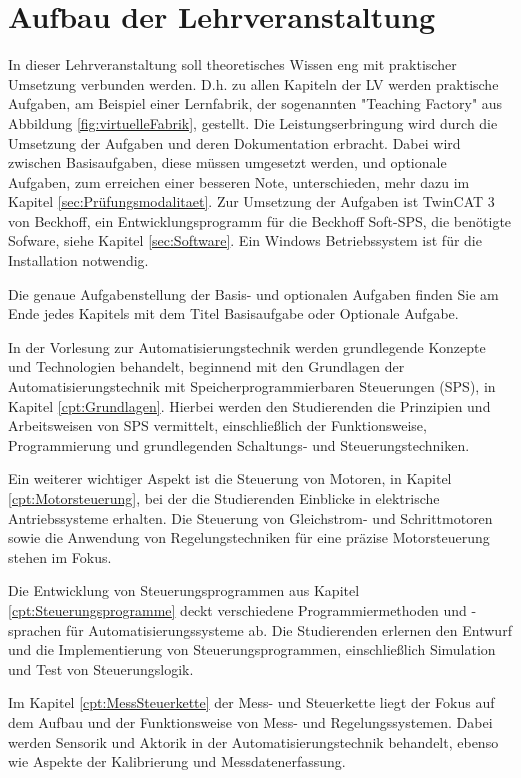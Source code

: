 \section{Aufbau der Lehrveranstaltung}

In dieser Lehrveranstaltung soll theoretisches Wissen eng mit praktischer Umsetzung verbunden werden. D.h. zu allen Kapiteln der LV werden praktische Aufgaben, am Beispiel einer Lernfabrik, der sogenannten "Teaching Factory" aus Abbildung \ref{fig:virtuelleFabrik}, gestellt. Die Leistungserbringung wird durch die Umsetzung der Aufgaben und deren Dokumentation erbracht. Dabei wird zwischen Basisaufgaben, diese müssen umgesetzt werden, und optionale Aufgaben, zum erreichen einer besseren Note, unterschieden, mehr dazu im Kapitel \ref{sec:Prüfungsmodalitaet}. Zur Umsetzung der Aufgaben ist TwinCAT 3 von Beckhoff, ein Entwicklungsprogramm für die Beckhoff Soft-SPS, die benötigte Sofware, siehe Kapitel \ref{sec:Software}. Ein Windows Betriebssystem ist für die Installation notwendig. 

Die genaue Aufgabenstellung der Basis- und optionalen Aufgaben finden Sie am Ende jedes Kapitels mit dem Titel Basisaufgabe oder Optionale Aufgabe. 



In der Vorlesung zur Automatisierungstechnik werden grundlegende Konzepte und Technologien behandelt, beginnend mit den Grundlagen der Automatisierungstechnik mit Speicherprogrammierbaren Steuerungen (SPS), in Kapitel \ref{cpt:Grundlagen}. Hierbei werden den Studierenden die Prinzipien und Arbeitsweisen von SPS vermittelt, einschließlich der Funktionsweise, Programmierung und grundlegenden Schaltungs- und Steuerungstechniken.

Ein weiterer wichtiger Aspekt ist die Steuerung von Motoren, in Kapitel \ref{cpt:Motorsteuerung}, bei der die Studierenden Einblicke in elektrische Antriebssysteme erhalten. Die Steuerung von Gleichstrom- und Schrittmotoren sowie die Anwendung von Regelungstechniken für eine präzise Motorsteuerung stehen im Fokus.

Die Entwicklung von Steuerungsprogrammen aus Kapitel \ref{cpt:Steuerungsprogramme} deckt verschiedene Programmiermethoden und -sprachen für Automatisierungssysteme ab. Die Studierenden erlernen den Entwurf und die Implementierung von Steuerungsprogrammen, einschließlich Simulation und Test von Steuerungslogik.

Im Kapitel \ref{cpt:MessSteuerkette} der Mess- und Steuerkette liegt der Fokus auf dem Aufbau und der Funktionsweise von Mess- und Regelungssystemen. Dabei werden Sensorik und Aktorik in der Automatisierungstechnik behandelt, ebenso wie Aspekte der Kalibrierung und Messdatenerfassung.

